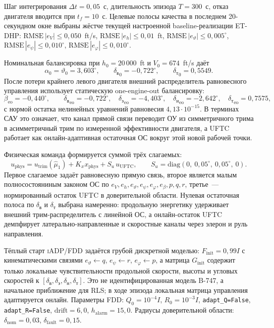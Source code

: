 \documentclass[a4paper,14pt]{extarticle}
\newcommand{\UFTC}{\textsc{UFTC}}
\newcommand{\ET}{\textsc{ET-DHP}}
\newcommand{\IADP}{\textsc{iADP}}
\newcommand{\FDD}{\textsc{FDD}}
\newcommand{\RLS}{\textsc{RLS}}
\newcommand{\degr}{^{\circ}}
\newcommand{\dv}{\delta_{\text{в}}}
\newcommand{\dn}{\delta_{\text{н}}}
\newcommand{\de}{\delta_{\text{э}}}
\newcommand{\dt}{\delta_{\text{т}}}
\begin{document}
Шаг интегрирования $\Delta t=0{,}05$~с, длительность эпизода $T=300$~с, отказ двигателя вводится при $t_f=10$~с. Целевые полосы качества в последнем 20-секундном окне выбраны жёстче текущей настроенной baseline-реализации \ET{}: $\mathrm{RMSE}\,|e_V|\le0{,}050$~ft/s, $\mathrm{RMSE}\,|e_h|\le0{,}01$~ft, $\mathrm{RMSE}\,|e_{\vartheta}|\le0{,}005\degr$, $\mathrm{RMSE}\,|e_{\psi}|\le0{,}010\degr$, $\mathrm{RMSE}\,|e_{\varphi}|\le0{,}010\degr$.

Номинальная балансировка при $h_0=20\,000$~ft и $V_0=674$~ft/s даёт
\[
\alpha_0=\vartheta_0=3{,}603\degr,\qquad
{\dv}_0=-0{,}722\degr,\qquad
{\dt}_0=0{,}5549.
\]
После потери крайнего левого двигателя внешний распределитель равновесного управления использует статическую one-engine-out балансировку:
\[
\beta_{\text{eo}}=-0{,}440\degr,\qquad
{\dv}_{\text{eo}}=-0{,}722\degr,\quad
{\de}_{\text{eo}}=-4{,}403\degr,\quad
{\dn}_{\text{eo}}=-2{,}642\degr,\quad
{\dt}_{\text{eo}}=0{,}7575,
\]
с нормой остатка нелинейных уравнений равновесия $4{,}13\cdot10^{-15}$. В терминах САУ это означает, что канал прямой связи переводит ОУ из симметричного трима в асимметричный трим по измеренной эффективности двигателя, а \UFTC{} работает как онлайн-адаптивная остаточная ОС вокруг этой новой рабочей точки.

Физическая команда формируется суммой трёх слагаемых:
\begin{equation}
u_{\text{phys}} =
u_{\text{trim}}(\hat\mu_1)
+K_x x_{\text{phys}}
+S_u\,u_{\mathrm{UFTC}},
\qquad
S_u=\mathrm{diag}(0,\ 0{,}05\degr,\ 0{,}05\degr,\ 0).
\label{eq:uftc-action-compose}
\end{equation}
Первое слагаемое задаёт равновесную прямую связь, второе является малым полносостояниным законом ОС по $e_V,e_h,e_{\vartheta},e_{\psi},e_{\varphi},e_{\beta},p,q,r$, третье~--- нормированный остаток \UFTC{} в доверительной области. Нулевая остаточная полоса по $\dv$ и $\dt$ выбрана намеренно: продольную энергетику удерживает внешний трим-распределитель с линейной ОС, а онлайн-остаток \UFTC{} демпфирует латерально-направленные и скоростные каналы через элерон и руль направления.

Тёплый старт \IADP{}/\FDD{} задаётся грубой дискретной моделью: $F_{\text{init}}=0{,}99I$ с кинематическими связями $e_{\vartheta}\leftarrow q$, $e_{\psi}\leftarrow r$, $e_{\varphi}\leftarrow p$, а матрица $G_{\text{init}}$ содержит только локальные чувствительности продольной скорости, высоты и угловых скоростей к $[\dv,\de,\dn,\dt]$. Это не идентифицированная модель B-747, а начальное приближение для \RLS{}; в ходе эпизода локальная матрица управления адаптируется онлайн. Параметры \FDD{}: $Q_0=10^{-4}I$, $R_0=10^{-3}I$, \texttt{adapt\_Q=False}, \texttt{adapt\_R=False}, $\mathrm{drift}=6{,}0$, $h_{\text{alarm}}=15{,}0$. Радиусы доверительной области: $\delta_{\text{nom}}=0{,}03$, $\delta_{\text{fault}}=0{,}15$.
\end{document}
